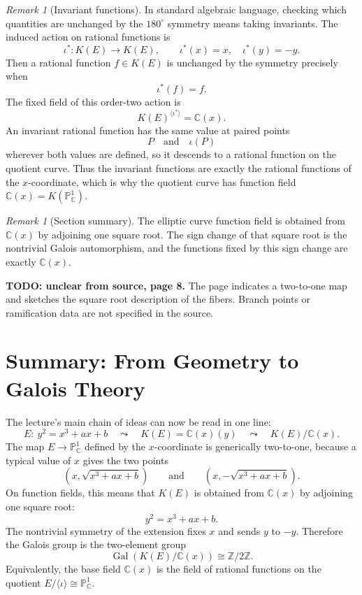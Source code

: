 \documentclass[11pt]{article}
\theoremstyle{definition}
\theoremstyle{remark}
\newtheorem{remark}[theorem]{Remark}
\newcommand{\C}{\mathbb{C}}
\newcommand{\Pj}{\mathbb{P}}
\newcommand{\Z}{\mathbb{Z}}
\newcommand{\K}{K}
\newcommand{\Gal}{\operatorname{Gal}}
\newcommand{\sourceunclear}[2]{%
  \par\smallskip
  \noindent\textbf{TODO: unclear from source, page #1.} #2
  \par\smallskip
}
\begin{document}
\begin{remark}[Invariant functions]
In standard algebraic language, checking which quantities are unchanged by the
\(180^\circ\) symmetry means taking invariants.  The induced action on rational
functions is
\[
  \iota^*\colon \K(E)\longrightarrow \K(E),
  \qquad
  \iota^*(x)=x,\quad \iota^*(y)=-y.
\]
Then a rational function \(f\in \K(E)\) is unchanged by the symmetry precisely
when
\[
  \iota^*(f)=f.
\]
The fixed field of this order-two action is
\[
  \K(E)^{\langle\iota^*\rangle}=\C(x).
\]
An invariant rational function has the same value at paired points
\[
  P\quad\text{and}\quad \iota(P)
\]
wherever both values are defined, so it descends to a rational function on the
quotient curve.  Thus the invariant functions are exactly the rational
functions of the \(x\)-coordinate, which is why the quotient curve has function
field \(\C(x)=\K(\Pj^1_{\C})\).
\end{remark}

\begin{remark}[Section summary]
The elliptic curve function field is obtained from \(\C(x)\) by adjoining
one square root.  The sign change of that square root is the nontrivial Galois
automorphism, and the functions fixed by this sign change are exactly
\(\C(x)\).
\end{remark}

\sourceunclear{8}{The page indicates a two-to-one map and sketches the square
root description of the fibers.  Branch points or ramification data are not
specified in the source.}

\section{Summary: From Geometry to Galois Theory}

The lecture's main chain of ideas can now be read in one line:
\[
  E:\ y^2=x^3+ax+b
  \quad\leadsto\quad
  \K(E)=\C(x)(y)
  \quad\leadsto\quad
  \K(E)/\C(x).
\]
The map \(E\to\Pj^1_{\C}\) defined by the \(x\)-coordinate is generically
two-to-one, because a typical value of \(x\) gives the two points
\[
  (x,\sqrt{x^3+ax+b})
  \qquad\text{and}\qquad
  (x,-\sqrt{x^3+ax+b}).
\]
On function fields, this means that \(\K(E)\) is obtained from \(\C(x)\) by
adjoining one square root:
\[
  y^2=x^3+ax+b.
\]
The nontrivial symmetry of the extension fixes \(x\) and sends \(y\) to
\(-y\).  Therefore the Galois group is the two-element group
\[
  \Gal(\K(E)/\C(x))\cong \Z/2\Z.
\]
Equivalently, the base field \(\C(x)\) is the field of rational functions on
the quotient \(E/\langle\iota\rangle\cong \Pj^1_{\C}\).
\end{document}
